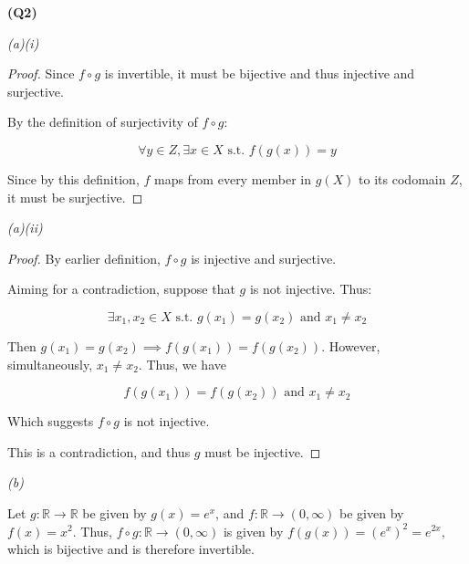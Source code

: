 \documentclass[12pt, a4paper]{article}
\newcommand{\R}{\mathbb{R}}
\newcommand{\st}{\text{ s.t. }}
\newcommand{\fn}[3]{#1 \colon #2 \to #3}
\begin{document}
\textbf{(Q2)}

\textit{(a)(i)}

\begin{proof}
    Since $f \circ g$ is invertible, it must be bijective and thus injective and
    surjective.

    By the definition of surjectivity of $f \circ g$:

    \[
        \forall y \in Z, \exists x \in X \st f(g(x)) = y
    \]

    Since by this definition, $f$ maps from every member in $g(X)$ to its codomain
    $Z$, it must be surjective.
\end{proof}

\textit{(a)(ii)}

\begin{proof}
    By earlier definition, $f \circ g$ is injective and surjective.

    Aiming for a contradiction, suppose that $g$ is not injective. Thus:
    
    \[
        \exists x_1, x_2 \in X \st g(x_1) = g(x_2) \text{ and } x_1 \neq x_2
    \]

    Then $g(x_1) = g(x_2) \implies f(g(x_1)) = f(g(x_2))$. However, simultaneously,
    $x_1 \neq x_2$. Thus, we have
    
    \[
        f(g(x_1)) = f(g(x_2)) \text{ and } x_1 \neq x_2
    \]

    Which suggests $f \circ g$ is not injective.

    This is a contradiction, and thus $g$ must be injective.
\end{proof}

\textit{(b)}

Let $\fn{g}{\R}{\R}$ be given by $g(x) = e^x$, and $\fn{f}{\R}{(0, \infty)}$ be
given by $f(x) = x^2$. Thus, $\fn{f \circ g}{\R}{(0, \infty)}$ is given by
$f(g(x)) = (e^x)^2 = e^{2x}$, which is bijective and is therefore invertible.
\end{document}
